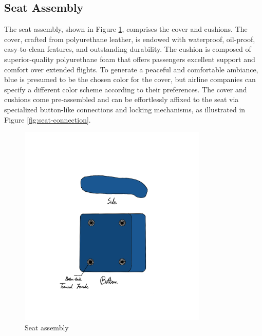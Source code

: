 \subsection{Seat Assembly}
The seat assembly, shown in Figure \ref{fig:seat-assembly}, comprises the cover and cushions. The cover, crafted from polyurethane leather, is endowed with waterproof, oil-proof, easy-to-clean features, and outstanding durability. The cushion is composed of superior-quality polyurethane foam that offers passengers excellent support and comfort over extended flights. To generate a peaceful and comfortable ambiance, blue is presumed to be the chosen color for the cover, but airline companies can specify a different color scheme according to their preferences. The cover and cushions come pre-assembled and can be effortlessly affixed to the seat via specialized button-like connections and locking mechanisms, as illustrated in Figure \ref{fig:seat-connection}.

\begin{figure}[!htp]
    \centering
    \includegraphics[width=0.8\textwidth]{images/Seat assembly.png}
    \caption{Seat assembly}
    \label{fig:seat-assembly}
\end{figure}

